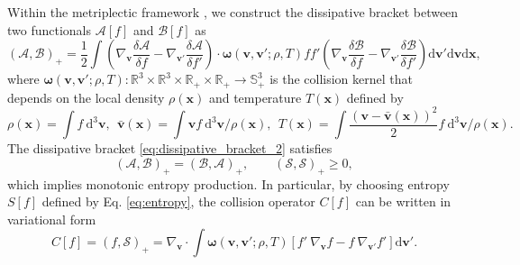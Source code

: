 \documentclass[preprint,1p,times]{elsarticle}
\theoremstyle{definition}
\theoremstyle{remark}
\begin{document}
Within the metriplectic framework \cite{morrison1986paradigm},  we construct the dissipative bracket between two functionals $\mathcal{A}[f]$ and $\mathcal{B}[f]$ as
\begin{equation}
    (\mathcal{A},\mathcal{B})_+ = \dfrac{1}{2} \int \left( \nabla_{\bm{v}} \dfrac{\delta \mathcal{A}}{\delta f} - \nabla_{\bm{v}'} \dfrac{\delta \mathcal{A}}{\delta f'} \right) \cdot \bm{\omega}(\bm{v},\bm{v}';\rho,T) f f' \left( \nabla_{\bm{v}} \dfrac{\delta \mathcal{B}}{\delta f} - \nabla_{\bm{v}'} \dfrac{\delta \mathcal{B}}{\delta f'} \right) \mathrm{d}\bm{v}' \mathrm{d}\bm{v}\mathrm{d}\bm{x} ,
\label{eq:dissipative_bracket_2}
\end{equation}
where $\bm{\omega}(\bm{v}, \bm{v}'; \rho, T): \mathbb{R}^3 \times \mathbb{R}^3 \times \mathbb{R}_{+} \times \mathbb{R}_{+} \to \mathbb{S}^{3}_{+}$ is the collision kernel that depends on the local density $\rho(\bm{x})$ and temperature $T(\bm{x})$ defined by 
\begin{equation*}
    \rho(\bm{x}) = \int f ~ \mathrm{d}^{3} \bm{v}, ~~ \bar{\bm{v}}(\bm{x}) = \int \bm{v} f ~ \mathrm{d}^{3} \bm{v} / \rho(\bm{x}), ~~ T(\bm{x}) = \int \dfrac{(\bm{v} - \bar{\bm{v}}(\bm{x}))^{2}}{2} f ~ \mathrm{d}^{3} \bm{v} / \rho(\bm{x}). 
\end{equation*}
The dissipative bracket \eqref{eq:dissipative_bracket_2} satisfies 
\begin{equation*}
    (\mathcal{A},\mathcal{B})_+ = (\mathcal{B},\mathcal{A})_+, \qquad (\mathcal{S},\mathcal{S})_+ \ge 0,
\end{equation*}
which implies monotonic entropy production. In particular, by choosing entropy $S[f]$ defined by Eq. \eqref{eq:entropy}, the collision operator $C[f]$ can be written in variational form 
\begin{equation}
    C[f] = \left( f, \mathcal{S} \right)_+ = \nabla_{\bm{v}} \cdot \int \bm{\omega}(\bm{v}, \bm{v}'; \rho, T) \left[ f' ~ \nabla_{\bm{v}} f - f ~ \nabla_{\bm{v}'} f' \right] \mathrm{d}\bm{v}'. 
\label{eq:collision_metripletic}
\end{equation}
\end{document}

